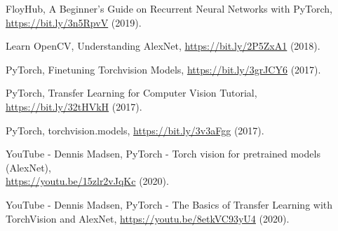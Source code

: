 \documentclass[a4paper]{article}
\begin{document}
\begin{thebibliography}{80}

     FloyHub, A Beginner’s Guide on Recurrent Neural Networks with PyTorch, \href{https://bit.ly/3n5RpvV}{https://bit.ly/3n5RpvV} (2019).
    
     Learn OpenCV, Understanding AlexNet, \href{https://bit.ly/2P5ZxA1}{https://bit.ly/2P5ZxA1} (2018).
    
     PyTorch, Finetuning Torchvision Models, \href{https://bit.ly/3grJCY6}{https://bit.ly/3grJCY6} (2017).
    
     PyTorch, Transfer Learning for Computer Vision Tutorial, \href{https://bit.ly/32tHVkH}{https://bit.ly/32tHVkH} (2017).

     PyTorch, torchvision.models, \href{https://bit.ly/3v3aFgg}{https://bit.ly/3v3aFgg} (2017).
    
     YouTube - Dennis Madsen, PyTorch - Torch vision for pretrained models (AlexNet),\\\href{https://youtu.be/15zlr2vJqKc}{https://youtu.be/15zlr2vJqKc} (2020).
    
     YouTube - Dennis Madsen, PyTorch - The Basics of Transfer Learning with TorchVision and AlexNet, \href{https://youtu.be/8etkVC93yU4}{https://youtu.be/8etkVC93yU4} (2020).
\end{thebibliography}
\end{document}
